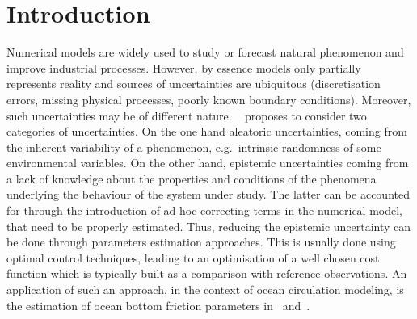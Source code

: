 \documentclass[preprint, 1p]{elsarticle}
\newcommand{\arthur}[1]{{\itshape\color{cyan} ({#1})}}
\newcommand{\victor}[1]{{\itshape\color{green} ({#1})}}
\begin{document}

\section*{Introduction}
\label{}



Numerical models are widely used to study or forecast natural phenomenon and improve industrial processes. However, by essence models only partially represents reality and sources of uncertainties are ubiquitous (discretisation errors, missing physical processes, poorly known boundary conditions).
%
Moreover, such uncertainties may be of different nature. 
~\cite{walker_defining_2003} proposes to consider two categories of uncertainties. On the one hand aleatoric uncertainties,  coming from the inherent variability of a phenomenon, e.g.\ intrinsic randomness of some environmental variables. On the other hand, epistemic uncertainties coming from a lack of knowledge about the properties and conditions of the phenomena underlying the behaviour of the system under study.
The latter can be accounted for through the introduction of ad-hoc correcting terms in the numerical model, that need to be properly estimated. Thus, reducing the epistemic uncertainty can be done through parameters estimation approaches. 
This is usually done using optimal control techniques, leading to an optimisation of a well chosen cost function which is typically built as a comparison with reference observations.
%
An application of such an approach, in the context of ocean circulation modeling, is the estimation of ocean bottom friction parameters in~\cite{das_estimation_1991} and~\cite{boutet_estimation_2015}. 
\end{document}

